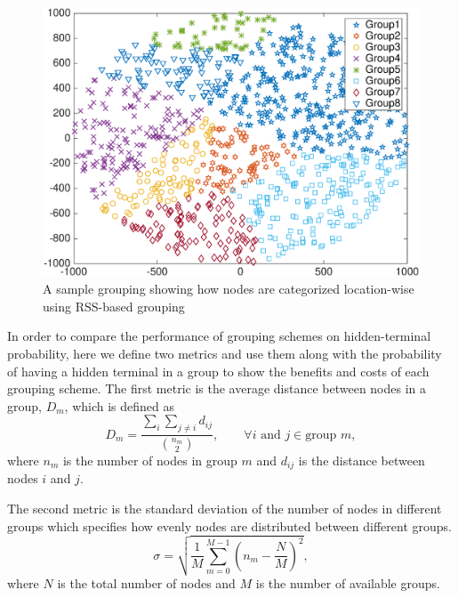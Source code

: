 \begin{figure} [th]
  \centering
  \includegraphics[width=.95\textwidth]{figures/sample_vonoroli}
  \caption{A sample grouping showing how nodes are categorized location-wise using RSS-based grouping}
  \label{fig:samplevonoroli}
\end{figure}

In order to compare the performance of grouping schemes on hidden-terminal probability, here we define two metrics and use them along with the probability of having a hidden terminal in a group to show the benefits and costs of each grouping scheme. The first metric is the average distance between nodes in a group, $D_m$, which is defined as
\begin{equation}
D_m=\frac{\sum_{i} \sum_{j \neq i} d_{ij}}{{n_m \choose 2}},  \quad \quad \forall i \text{ and } j \in \text{group $m$},
\end{equation}
where $n_m$ is the number of nodes in group $m$ and $d_{ij}$ is the distance between nodes $i$ and $j$.

The second metric is the standard deviation of the number of nodes in different groups which specifies how evenly nodes are distributed between different groups.
\begin{equation}
\sigma=\sqrt{\frac{1}{M}\sum_{m=0}^{M-1}\left( n_m - \frac{N}{M} \right)^2},
\end{equation}
where $N$ is the total number of nodes and $M$ is the number of available groups.


